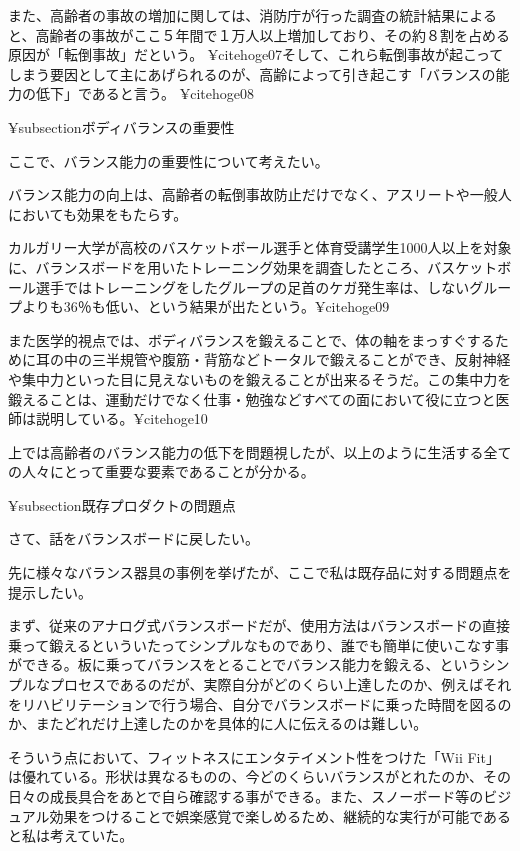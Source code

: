 また、高齢者の事故の増加に関しては、消防庁が行った調査の統計結果によると、高齢者の事故がここ５年間で１万人以上増加しており、その約８割を占める原因が「転倒事故」だという。 ¥cite{hoge07}そして、これら転倒事故が起こってしまう要因として主にあげられるのが、高齢によって引き起こす「バランスの能力の低下」であると言う。 ¥cite{hoge08}


¥subsection{ボディバランスの重要性}

ここで、バランス能力の重要性について考えたい。

バランス能力の向上は、高齢者の転倒事故防止だけでなく、アスリートや一般人においても効果をもたらす。

カルガリー大学が高校のバスケットボール選手と体育受講学生1000人以上を対象に、バランスボードを用いたトレーニング効果を調査したところ、バスケットボール選手ではトレーニングをしたグループの足首のケガ発生率は、しないグループよりも36％も低い、という結果が出たという。¥cite{hoge09}

また医学的視点では、ボディバランスを鍛えることで、体の軸をまっすぐするために耳の中の三半規管や腹筋・背筋などトータルで鍛えることができ、反射神経や集中力といった目に見えないものを鍛えることが出来るそうだ。この集中力を鍛えることは、運動だけでなく仕事・勉強などすべての面において役に立つと医師は説明している。¥cite{hoge10}

上では高齢者のバランス能力の低下を問題視したが、以上のように生活する全ての人々にとって重要な要素であることが分かる。




¥subsection{既存プロダクトの問題点}

さて、話をバランスボードに戻したい。

先に様々なバランス器具の事例を挙げたが、ここで私は既存品に対する問題点を提示したい。

まず、従来のアナログ式バランスボードだが、使用方法はバランスボードの直接乗って鍛えるといういたってシンプルなものであり、誰でも簡単に使いこなす事ができる。板に乗ってバランスをとることでバランス能力を鍛える、というシンプルなプロセスであるのだが、実際自分がどのくらい上達したのか、例えばそれをリハビリテーションで行う場合、自分でバランスボードに乗った時間を図るのか、またどれだけ上達したのかを具体的に人に伝えるのは難しい。

そういう点において、フィットネスにエンタテイメント性をつけた「Wii Fit」は優れている。形状は異なるものの、今どのくらいバランスがとれたのか、その日々の成長具合をあとで自ら確認する事ができる。また、スノーボード等のビジュアル効果をつけることで娯楽感覚で楽しめるため、継続的な実行が可能であると私は考えていた。


